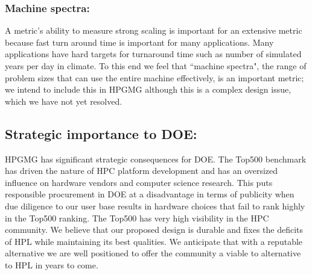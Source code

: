 \documentclass[11pt]{amsart}
\begin{document}
\subsubsection*{Machine spectra:}
A metric's ability to measure strong scaling is important for an extensive metric because fast turn around time is important for many applications.
Many applications have hard targets for turnaround time such as number of simulated years per day in climate.
To this end we feel that ``machine spectra", the range of problem sizes that can use the entire machine effectively, is an important metric; we intend to include this in HPGMG although this is a complex design issue, which we have not yet resolved.

\subsection*{Strategic importance to DOE:} HPGMG has significant strategic consequences for DOE. 
The Top500 benchmark has driven the nature of HPC platform development and has an oversized influence on hardware vendors and computer science research.
This puts responsible procurement in DOE at a disadvantage in terms of publicity when due diligence to our user base results in hardware choices that fail to rank highly in the Top500 ranking. 
The Top500 has very high visibility in the HPC community. 
We believe that our proposed design is durable and fixes the deficits of HPL while maintaining its best qualities. 
We anticipate that with a reputable alternative we are well positioned to offer the community a viable to alternative to HPL in years to come.

%

%
\end{document}
